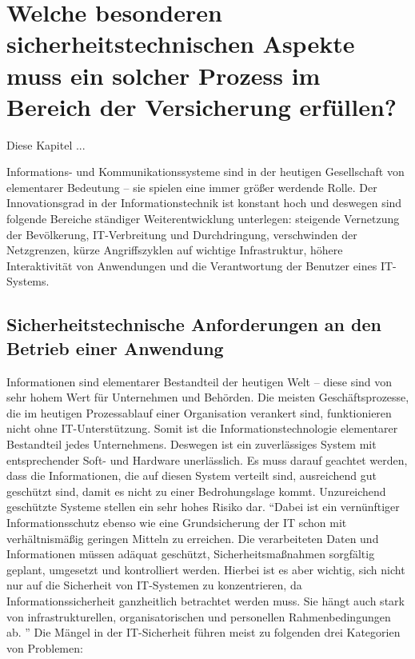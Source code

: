 \chapter[Forschungsfrage 3]{Welche besonderen sicherheitstechnischen Aspekte muss ein solcher Prozess im Bereich der Versicherung erfüllen?} \label{ff3}
Diese Kapitel ... \par
Informations- und Kommunikationssysteme sind in der heutigen Gesellschaft von elementarer Bedeutung -- sie spielen eine immer größer werdende Rolle. Der Innovationsgrad in der Informationstechnik ist konstant hoch und deswegen sind folgende Bereiche ständiger Weiterentwicklung unterlegen: steigende Vernetzung der Bevölkerung, IT-Verbreitung und Durchdringung, verschwinden der Netzgrenzen, kürze Angriffszyklen auf wichtige Infrastruktur, höhere Interaktivität von Anwendungen und die Verantwortung der Benutzer eines IT-Systems.\autocite[vgl.][S.2f.]{bundesamt_fur_sicherheit_in_der_informationstechnik_bsi_it-grundschutz-kompendium_2020}

\section{Sicherheitstechnische Anforderungen an den Betrieb einer Anwendung}
Informationen sind elementarer Bestandteil der heutigen Welt -- diese sind von sehr hohem Wert für Unternehmen und Behörden. Die meisten Geschäftsprozesse, die im heutigen Prozessablauf einer Organisation verankert sind, funktionieren nicht ohne IT-Unterstützung. Somit ist die Informationstechnologie elementarer Bestandteil jedes Unternehmens. Deswegen ist ein zuverlässiges System mit entsprechender Soft- und Hardware unerlässlich. Es muss darauf geachtet werden, dass die Informationen, die auf diesen System verteilt sind, ausreichend gut geschützt sind, damit es nicht zu einer Bedrohungslage kommt. Unzureichend geschützte Systeme stellen ein sehr hohes Risiko dar. \enquote{Dabei ist ein vernünftiger Informationsschutz ebenso wie eine Grundsicherung der IT schon mit verhältnismäßig geringen Mitteln zu erreichen. Die verarbeiteten Daten und Informationen müssen adäquat geschützt, Sicherheitsmaßnahmen sorgfältig geplant, umgesetzt und kontrolliert werden. Hierbei ist es aber wichtig, sich nicht nur auf die Sicherheit von IT-Systemen zu konzentrieren, da Informationssicherheit ganzheitlich betrachtet werden muss. Sie	hängt auch stark von infrastrukturellen, organisatorischen und personellen Rahmenbedingungen ab. }\autocite[][S.1]{bundesamt_fur_sicherheit_in_der_informationstechnik_bsi_it-grundschutz-kompendium_2020} Die Mängel in der IT-Sicherheit führen meist zu folgenden drei Kategorien von Problemen\autocite[vgl.][S.1ff.]{bundesamt_fur_sicherheit_in_der_informationstechnik_bsi_it-grundschutz-kompendium_2020}: 

